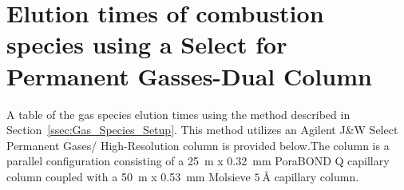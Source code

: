 \documentclass[12pt]{article}
\begin{document}
\pagebreak

\section{Elution times of combustion species using a Select for Permanent Gasses-Dual Column}\label{sec:Elution Times}

A table of the gas species elution times using the method described in Section~\ref{ssec:Gas_Species_Setup}. This method utilizes an Agilent J\&W Select Permanent Gases/ High-Resolution column is provided below.The column is a parallel configuration consisting of a 25~m x 0.32~mm PoraBOND Q capillary column coupled with a 50~m x 0.53~mm Molsieve $\SI{5}{\angstrom}$ capillary column.

\begin{table}[h!]


\end{table}
\end{document}
